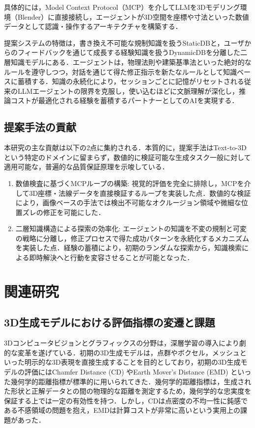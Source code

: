 \documentclass[dvipdfmx, a4paper, 9pt]{deimj}
\begin{document}
具体的には，Model Context Protocol（MCP）\cite{anthropic2024mcp}を介してLLMを3Dモデリング環境（Blender）に直接接続し，エージェントが3D空間を座標や寸法といった数値データとして認識・操作するアーキテクチャを構築する．

提案システムの特徴は，書き換え不可能な規制知識を扱うStaticDBと，ユーザからのフィードバックを通じて成長する経験知識を扱うDynamicDBを分離した二層知識モデルにある．エージェントは，物理法則や建築基準法といった絶対的なルールを遵守しつつ，対話を通じて得た修正指示を新たなルールとして知識ベースに蓄積する．知識の永続化により，セッションごとに記憶がリセットされる従来のLLMエージェントの限界を克服し，使い込むほどに文脈理解が深化し，推論コストが最適化される経験を蓄積するパートナーとしてのAIを実現する．

\subsection{提案手法の貢献}

本研究の主な貢献は以下の2点に集約される．本質的に，提案手法はText-to-3Dという特定のドメインに留まらず，数値的に検証可能な生成タスク一般に対して適用可能な，普遍的な品質保証原理を示唆している．
\begin{enumerate}
    \item 数値検査に基づくMCPループの構築: 
    視覚的評価を完全に排除し，MCPを介して3D座標・法線データを直接検証するループを実装した点．数値的な検証により，画像ベースの手法では検出不可能なオクルージョン領域や微細な位置ズレの修正を可能にした．
    \item 二層知識構造による探索の効率化: 
    エージェントの知識を不変の規制と可変の戦略に分離し，修正プロセスで得た成功パターンを永続化するメカニズムを実装した点．経験の蓄積により，初期のランダムな探索から，知識検索による即時解決へと行動を変容させることが可能となった．
\end{enumerate}

\section{関連研究}

\subsection{3D生成モデルにおける評価指標の変遷と課題}

3Dコンピュータビジョンとグラフィックスの分野は，深層学習の導入により劇的な変革を遂げている．初期の3D生成モデルは，点群やボクセル，メッシュといった明示的な3D表現を直接生成することを目的としており，初期の3D生成モデルの評価にはChamfer Distance (CD) やEarth Mover's Distance (EMD) といった幾何学的距離指標が標準的に用いられてきた\cite{fan2017point,nichol2022point}．幾何学的距離指標は，生成された形状と正解データとの間の物理的な距離を測定するため，幾何学的な忠実度を保証する上では一定の有効性を持つ．しかし，CDは点密度の不均一性に鈍感である不感領域の問題を抱え，EMDは計算コストが非常に高いという実用上の課題があった．
\end{document}
